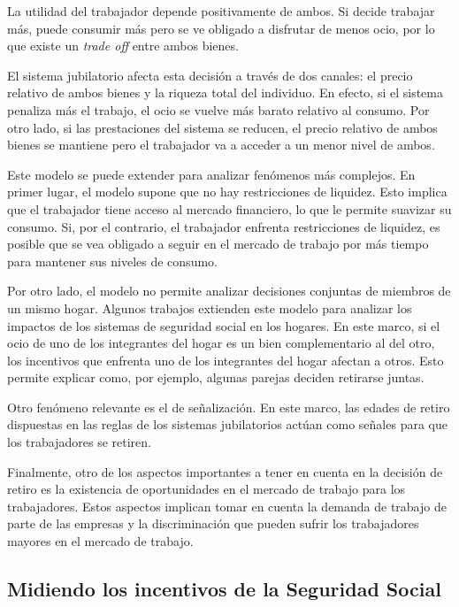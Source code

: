 \documentclass[]{article}
\begin{document}
La utilidad del trabajador depende positivamente de ambos. Si decide
trabajar más, puede consumir más pero se ve obligado a disfrutar de
menos ocio, por lo que existe un \emph{trade off} entre ambos bienes.

El sistema jubilatorio afecta esta decisión a través de dos canales: el
precio relativo de ambos bienes y la riqueza total del individuo. En
efecto, si el sistema penaliza más el trabajo, el ocio se vuelve más
barato relativo al consumo. Por otro lado, si las prestaciones del
sistema se reducen, el precio relativo de ambos bienes se mantiene pero
el trabajador va a acceder a un menor nivel de ambos.

Este modelo se puede extender para analizar fenómenos más complejos. En
primer lugar, el modelo supone que no hay restricciones de liquidez.
Esto implica que el trabajador tiene acceso al mercado financiero, lo
que le permite suavizar su consumo. Si, por el contrario, el trabajador
enfrenta restricciones de liquidez, es posible que se vea obligado a
seguir en el mercado de trabajo por más tiempo para mantener sus niveles
de consumo.

Por otro lado, el modelo no permite analizar decisiones conjuntas de
miembros de un mismo hogar. Algunos trabajos extienden este modelo para
analizar los impactos de los sistemas de seguridad social en los
hogares. En este marco, si el ocio de uno de los integrantes del hogar
es un bien complementario al del otro, los incentivos que enfrenta uno
de los integrantes del hogar afectan a otros. Esto permite explicar
como, por ejemplo, algunas parejas deciden retirarse juntas.

Otro fenómeno relevante es el de señalización. En este marco, las edades
de retiro dispuestas en las reglas de los sistemas jubilatorios actúan
como señales para que los trabajadores se retiren.

Finalmente, otro de los aspectos importantes a tener en cuenta en la
decisión de retiro es la existencia de oportunidades en el mercado de
trabajo para los trabajadores. Estos aspectos implican tomar en cuenta
la demanda de trabajo de parte de las empresas y la discriminación que
pueden sufrir los trabajadores mayores en el mercado de trabajo.

\hypertarget{midiendo-los-incentivos-de-la-seguridad-social}{%
\subsection{Midiendo los incentivos de la Seguridad
Social}\label{midiendo-los-incentivos-de-la-seguridad-social}}
\end{document}
